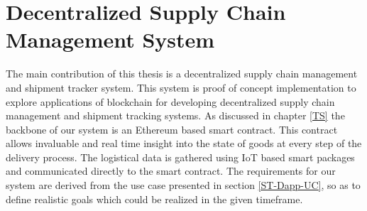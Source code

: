 \section{Decentralized Supply Chain Management System} \label{usecase} 
The main contribution of this thesis is a decentralized supply chain management and shipment tracker system. This system is proof of concept implementation to explore applications of blockchain for developing decentralized supply chain management and shipment tracking systems. As discussed in chapter \ref{TS} the backbone of our system is an Ethereum based smart contract. This contract allows invaluable and real time insight into the state of goods at every step of the delivery process. The logistical data is gathered using IoT based smart packages and communicated directly to the smart contract. The requirements for our system are derived from the use case presented in section \ref{ST-Dapp-UC}, so as to define realistic goals which could be realized in the given timeframe.


